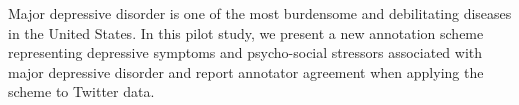 Major depressive disorder is one of the most burdensome and debilitating diseases in the United States. In this pilot study, we present a new annotation scheme representing depressive symptoms and psycho-social stressors associated with major depressive disorder and report annotator agreement when applying the scheme to Twitter data.

